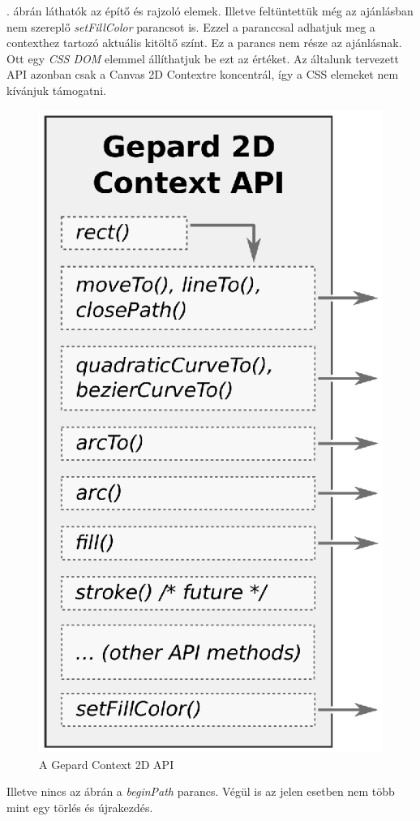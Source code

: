\documentclass[12pt]{report}
\theoremstyle{definition}
\begin{document}
. ábrán láthatók az építő és rajzoló
elemek. Illetve feltüntettük még az ajánlásban nem szereplő
\emph{setFillColor} parancsot is. Ezzel a paranccsal adhatjuk meg a
contexthez tartozó aktuális kitöltő színt. Ez a parancs nem része
az ajánlásnak. Ott egy \emph{CSS DOM} elemmel állíthatjuk be ezt
az értéket. Az általunk tervezett API azonban csak a Canvas 2D
Contextre koncentrál, így a CSS elemeket nem kívánjuk támogatni.
    \begin{figure}
    \begin{center}
      \includegraphics[scale=0.6]{img/dataflow_canvas_api_eps}
    \end{center}
      \caption{\label{dataflow-canvas-API-diagram}
      A Gepard Context 2D API}
    \end{figure}
Illetve nincs az ábrán a \emph{beginPath} parancs. Végül is az
jelen esetben nem több mint egy törlés és újrakezdés.
\end{document}
